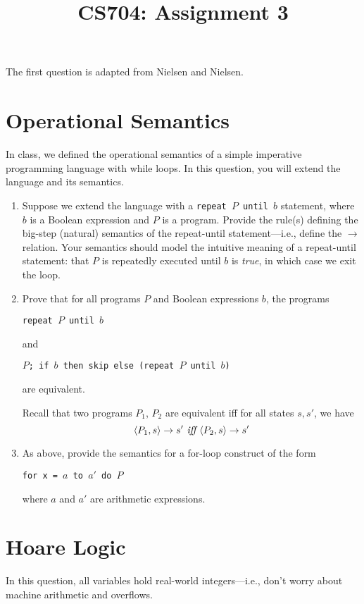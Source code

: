 \documentclass[11pt, oneside]{article}   	%
\title{CS704: Assignment 3}
\author{}
\date{}							%
\begin{document}
\maketitle

The first question is adapted from Nielsen and Nielsen.

\section{Operational Semantics}
In class, we defined the operational semantics of a simple imperative programming language with while loops. In this question, you will extend the language and its semantics.

\begin{enumerate}[label=\bf\Alph*]
  \item Suppose we extend the language with a \texttt{repeat $P$ until $b$} statement, where $b$ is a Boolean expression
  and $P$ is a program.
  Provide the rule(s) defining
   the big-step (natural) semantics of the
   repeat-until statement---i.e., define the $\to$ relation.
  Your semantics should model the intuitive
  meaning of a repeat-until statement: that $P$ is repeatedly
  executed until $b$ is \emph{true}, in which case we exit the
  loop.

  \item Prove that for all programs $P$ and Boolean expressions $b$,
  the programs

  \texttt{repeat $P$ until $b$}

  and

  \texttt{$P$; if $b$ then skip else (repeat $P$ until $b$)}

  are equivalent.

  Recall that two programs $P_1$, $P_2$ are equivalent
  iff  for all states $s,s'$,
  we have
  $$\langle P_1, s \rangle \to s' \emph{ iff } \langle P_2, s \rangle \to s'$$

  \item As above, provide the semantics for
  a for-loop construct of the form

  \texttt{for x = $a$ to $a'$ do $P$}

  where $a$ and $a'$ are arithmetic expressions.

\end{enumerate}
\section{Hoare Logic}

In this question, all variables hold real-world integers---i.e.,
don't worry about machine arithmetic and  overflows.
\end{document}
